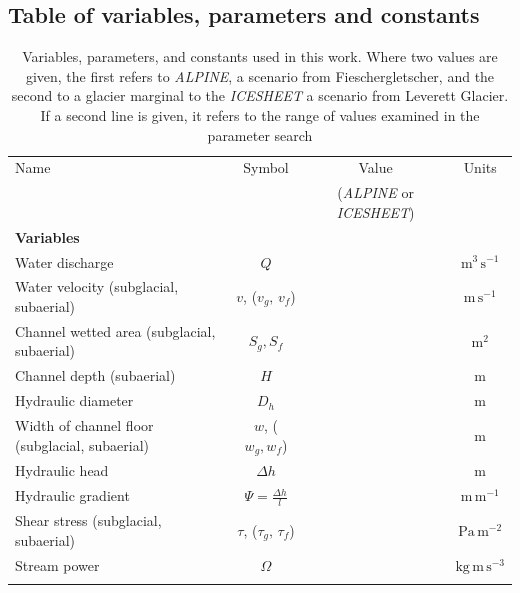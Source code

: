 \documentclass[draft]{agujournal2019}
\newcommand{\alpine}{\textit{ALPINE}}
\newcommand{\icesheet}{\textit{ICESHEET}}
\begin{document}
\subsection{Table of variables, parameters and constants}
\begin{table}[h]
  \centering
  \caption{Variables, parameters, and constants used in this work.
    Where two values are given, the first refers to  \alpine{}, a scenario from Fieschergletscher, and the second to a glacier marginal to the \icesheet{} a scenario from Leverett Glacier. If a second line is given, it refers to the range of values examined in the parameter search}
  \small 
  \begin{tabular}{ l  c  c c }
    Name &Symbol&  Value&Units \\
         && (\alpine{} or \icesheet{})\\
    \hline
    \textbf{Variables}  & & & \\
    Water discharge  & $Q$& & $\mathrm{m^{3}\,s^{-1}}$ \\
    Water velocity (subglacial, subaerial)  & $v$, ($v_g,\,v_{f}$)& & $\mathrm{m\,s^{-1}}$ \\
    Channel wetted area (subglacial, subaerial) &  $S_g, S_f$& & $\mathrm{m^2}$     \\
    Channel depth (subaerial) & $H$&& $\mathrm{m}$\\
    Hydraulic diameter &$D_h$&&$\mathrm{m}$\\
    Width of channel floor (subglacial, subaerial) & $w$, ($w_g,w_f$)&  & $\mathrm{m}$     \\
    Hydraulic head &$\Delta h$&& $\mathrm{m}$\\
    Hydraulic gradient &$\Psi=\frac{\Delta h}{l}$&& $\mathrm{m\, m^{-1}}$\\
    Shear stress (subglacial, subaerial) & $\tau$, ($\tau_g,\,\tau_f$) && $\mathrm{Pa \, m^{-2}}$ \\
    Stream power & $\Omega$ && $\mathrm{ kg \, m\, s^{-3}}$ \\

         &&&\\


\end{tabular}
\end{table}
\end{document}
